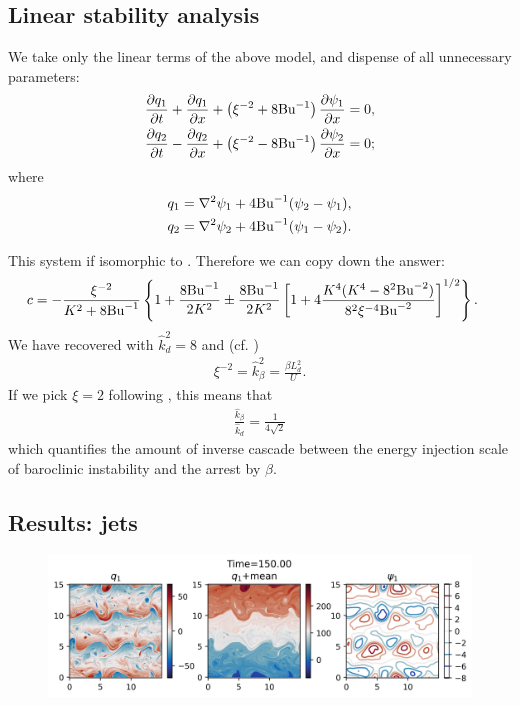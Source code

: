 \subsection{Linear stability analysis}
We take only the linear terms of the above model, and dispense of all unnecessary parameters:
\begin{align}
    &\frac{\partial q_1}{\partial t}+\frac{\partial q_1}{\partial x}+\left(\xi^{-2}+8\text{Bu}^{-1}\right)\frac{\partial\psi_1}{\partial x} = 0,\label{eq:2lay_sym_eq1_lin}\\
    &\frac{\partial q_2}{\partial t}-\frac{\partial q_2}{\partial x}+\left(\xi^{-2}-8\text{Bu}^{-1}\right)\frac{\partial\psi_2}{\partial x} = 0;\label{eq:2lay_sym_eq2_lin}
\end{align}
where
\begin{align}
    q_1 &= \nabla^2\psi_1 + 4\text{Bu}^{-1}(\psi_2-\psi_1),\label{eq:2lay_sym_pv1_lin}\\
    q_2 &= \nabla^2\psi_2 + 4\text{Bu}^{-1}(\psi_1-\psi_2).\label{eq:2lay_sym_pv2_lin}
\end{align}

This system if isomorphic to \cite[(9.107)]{Vallis_17}. Therefore we can copy down the answer:
\begin{align}
    c &= -\frac{\xi^{-2}}{K^2+8\text{Bu}^{-1}}\left\{ 1+\frac{8\text{Bu}^{-1}}{2K^2}\pm\frac{8\text{Bu}^{-1}}{2K^2}\left[1+4\frac{K^4(K^4-8^2\text{Bu}^{-2})}{8^2\xi^{-4}\text{Bu}^{-2}}\right]^{1/2} \right\}.
\end{align}
We have recovered \cite[(9.114)]{Vallis_17} with $\hat{k}_d^2 = 8$ and (cf. \cite[(9.115)]{Vallis_17})
\begin{align}
    \xi^{-2} = \hat{k}_\beta^2 = \frac{\beta L_d^2}{U}.
\end{align}
If we pick $\xi=2$ following \cite[Table 1]{HeldLarichev_96}, this means that
\begin{align}
    \frac{\hat{k}_\beta}{\hat{k}_d} = \frac{1}{4\sqrt{2}}
\end{align}
which quantifies the amount of inverse cascade between the energy injection scale of baroclinic instability and the arrest by $\beta$.

\subsection{Results: jets}

\begin{figure}
    \centering
    \includegraphics{2Layjets_q1_t150d00}
    \caption{}
    \label{fig:2Layjets_q1_t150d00}
\end{figure}

